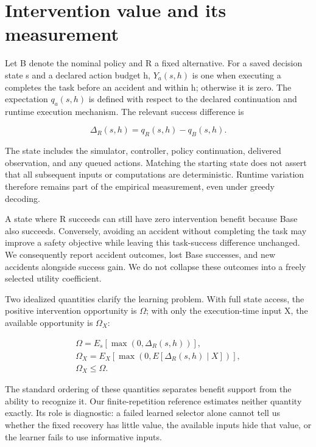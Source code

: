 \section{Intervention value and its measurement}

Let B denote the nominal policy and R a fixed alternative. For a saved decision state s and a declared action budget h, $Y_a(s,h)$ is one when executing a completes the task before an accident and within h; otherwise it is zero. The expectation $q_a(s,h)$ is defined with respect to the declared continuation and runtime execution mechanism. The relevant success difference is


\begin{equation}\Delta_R(s,h)=q_R(s,h)-q_B(s,h).\end{equation}

The state includes the simulator, controller, policy continuation, delivered observation, and any queued actions. Matching the starting state does not assert that all subsequent inputs or computations are deterministic. Runtime variation therefore remains part of the empirical measurement, even under greedy decoding.


A state where R succeeds can still have zero intervention benefit because Base also succeeds. Conversely, avoiding an accident without completing the task may improve a safety objective while leaving this task-success difference unchanged. We consequently report accident outcomes, lost Base successes, and new accidents alongside success gain. We do not collapse these outcomes into a freely selected utility coefficient.


Two idealized quantities clarify the learning problem. With full state access, the positive intervention opportunity is $\Omega$; with only the execution-time input X, the available opportunity is $\Omega_X$:


\begin{equation}\begin{gathered}\Omega=E_s[\max(0,\Delta_R(s,h))],\\ \Omega_X=E_X[\max(0,E[\Delta_R(s,h)\mid X])],\\ \Omega_X\leq\Omega.\end{gathered}\end{equation}

The standard ordering of these quantities separates benefit support from the ability to recognize it. Our finite-repetition reference estimates neither quantity exactly. Its role is diagnostic: a failed learned selector alone cannot tell us whether the fixed recovery has little value, the available inputs hide that value, or the learner fails to use informative inputs.


